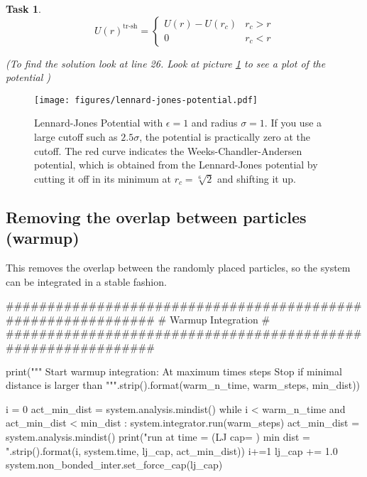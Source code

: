 \documentclass[
paper=a4,                       %
fontsize=11pt,                  %
twoside,                        %
footsepline,                    %
headsepline,                    %
headinclude=false,              %
footinclude=false,              %
pagesize,                       %
]{scrartcl}
\newtheorem{task}{Task}
\begin{document}
{{\begin{minipage}{0.95\textwidth}
\begin{task}
     \[ U(r)^{\text{tr-sh}}  =\left\{ \begin{array}{ll}  U(r)-U(r_{c})  &  r_{c} > r \\
     
     0 &   r_{c}  < r \end{array} \right. \]
     
  (To find the solution look at line 26. Look at picture \ref{pic:lennard-jones} to see a plot of the potential )

   \end{task}

\end{minipage}}\vspace{1cm}

\begin{figure}[ht]
\begin{center}
\texttt{[image: figures/lennard-jones-potential.pdf]}
\caption[long text]{Lennard-Jones Potential with
  $\epsilon=1$ and radius $\sigma=1$. If you use a large cutoff such as
  $2.5\sigma$, the potential is practically zero at the cutoff. The
  red curve indicates the Weeks-Chandler-Andersen potential, which
  is obtained from the Lennard-Jones potential by cutting it off in
  its minimum at $r_c=\sqrt[6]{2}$ and shifting it up.}
\label{pic:lennard-jones}
\end{center}
\end{figure}


\subsection{Removing the overlap between particles (warmup)}

This removes the overlap between the randomly placed particles, so the system can be integrated in a stable fashion.
\begin{pypresso}
#############################################################
#  Warmup Integration                                       #
#############################################################

print("""
Start warmup integration:
At maximum {} times {} steps
Stop if minimal distance is larger than {}
""".strip().format(warm_n_time, warm_steps, min_dist))

i = 0
act_min_dist = system.analysis.mindist()
while i < warm_n_time and act_min_dist < min_dist :
    system.integrator.run(warm_steps)
    act_min_dist = system.analysis.mindist()
    print("run {} at time = {} (LJ cap= {} ) min dist = {}".strip().format(i, system.time, lj_cap, act_min_dist))
    i+=1
    lj_cap += 1.0
    system.non_bonded_inter.set_force_cap(lj_cap)


\end{pypresso}}
\end{document}
